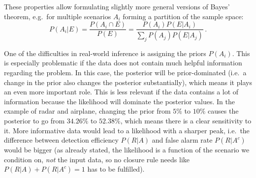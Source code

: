 These properties allow formulating slightly more general versions of Bayes' theorem, e.g.~for multiple scenarios $A_i$ forming a partition of the sample space:
\begin{equation}\label{eq:bayes_events_general}
P(A_i | E) = \frac{P(A_i \cap E)}{P(E)} = \frac{P(A_i) P(E | A_i)}{\sum_j P(A_j) P(E | A_j)} \, .
\end{equation}

One of the difficulties in real-world inference is assigning the priors $P(A_i)$. This is especially problematic if the data does not contain much helpful information regarding the problem. In this case, the posterior will be prior-dominated (i.e.~a change in the prior also changes the posterior substantially), which means it plays an even more important role. This is less relevant if the data contains a lot of information because the likelihood will dominate the posterior values. In the example of radar and airplane, changing the prior from $5\%$ to $10\%$ causes the posterior to go from $34.26\%$ to $52.38\%$, which means there is a clear sensitivity to it. More informative data would lead to a likelihood with a sharper peak, i.e.~the difference between detection efficiency $P(R | A)$ and false alarm rate $P(R | A^c)$ would be bigger (as already stated, the likelihood is a function of the scenario we condition on, \emph{not} the input data, so no closure rule needs like $P(R | A) + P(R | A^c) = 1$ has to be fulfilled).





